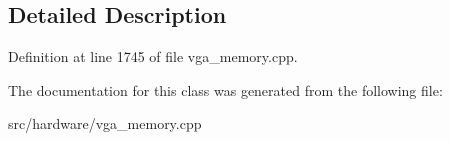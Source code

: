 \subsection{Detailed Description}


Definition at line 1745 of file vga\-\_\-memory.\-cpp.



The documentation for this class was generated from the following file\-:\begin{DoxyCompactItemize}
\item 
src/hardware/vga\-\_\-memory.\-cpp\end{DoxyCompactItemize}
